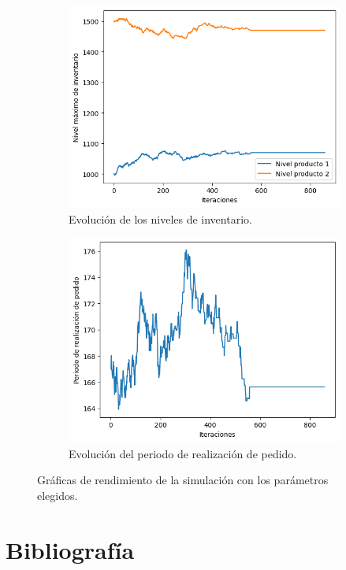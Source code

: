 \documentclass[a4paper,12pt]{article}
\begin{document}
\begin{figure}[H]
\begin{subfigure}{.45\textwidth}
			\includegraphics[width=\textwidth]{include/ultima_ejec/niv_inv.png}
			\caption{Evolución de los niveles de inventario. }
		\end{subfigure}
		\hfill
		\begin{subfigure}{.45\textwidth}
			\centering
			\includegraphics[width=\textwidth]{include/ultima_ejec/periodo.png}
			\caption{Evolución del periodo de realización de pedido. }
		\end{subfigure}
		\caption{Gráficas de rendimiento de la simulación con los parámetros elegidos.}
		\label{result-graphs}
	\end{figure}
	
	\newpage
	\section*{Bibliografía}
	
	
	
\end{document}
